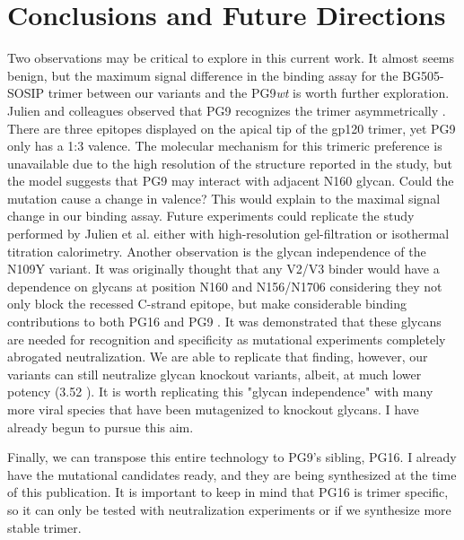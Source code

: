 \section{Conclusions and Future Directions}
Two observations may be critical to explore in this current work. It almost seems benign, but the maximum signal difference in the binding assay for the BG505-SOSIP trimer between our variants and the PG9\textit{wt} is worth further exploration. Julien and colleagues observed that PG9 recognizes the trimer asymmetrically \citep{Julien:2013jp}. There are three epitopes displayed on the apical tip of the gp120 trimer, yet PG9 only has a 1:3 valence. The molecular mechanism for this trimeric preference is unavailable due to the high resolution of the structure reported in the study, but the model suggests that PG9 may interact with adjacent N160 glycan. Could the mutation cause a change in valence? This would explain to the maximal signal change in our binding assay. Future experiments could replicate the study performed by Julien et al. either with high-resolution gel-filtration or isothermal titration calorimetry.
Another observation is the glycan independence of the N109Y variant. It was originally thought that any V2/V3 binder would have a dependence on glycans at position N160 and N156/N1706 considering they not only block the recessed C-strand epitope, but make considerable binding contributions to both PG16 and PG9 \citep{McLellan:2011dg,Pancera:2013ev}. It was demonstrated that these glycans are needed for recognition and specificity as mutational experiments completely abrogated neutralization. We are able to replicate that finding, however, our variants can still neutralize glycan knockout variants, albeit, at much lower potency (3.52 \mcml). It is worth replicating this "glycan independence" with many more viral species that have been mutagenized to knockout glycans. I have already begun to pursue this aim.

Finally, we can transpose this entire technology to PG9's sibling, PG16. I already have the mutational candidates ready, and they are being synthesized at the time of this publication. It is important to keep in mind that PG16 is trimer specific, so it can only be tested with neutralization experiments or if we synthesize more stable trimer.




